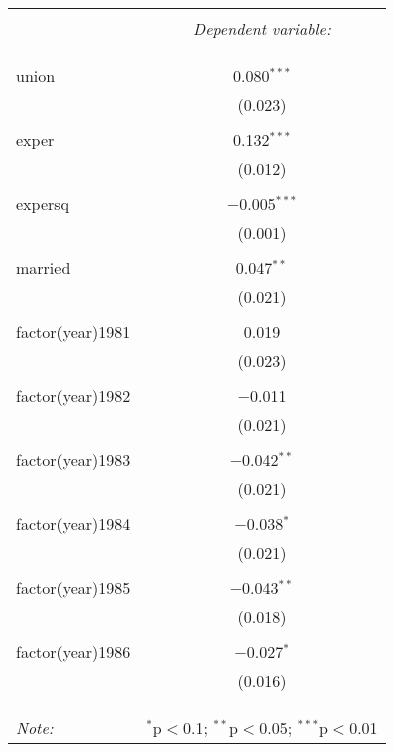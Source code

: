 
\begin{table}[!htbp] \centering 
  \caption{} 
  \label{} 
\begin{tabular}{@{\extracolsep{5pt}}lc} 
\\[-1.8ex]\hline 
\hline \\[-1.8ex] 
 & \multicolumn{1}{c}{\textit{Dependent variable:}} \\ 
\cline{2-2} 
\\[-1.8ex] &   \\ 
\hline \\[-1.8ex] 
 union & 0.080$^{***}$ \\ 
  & (0.023) \\ 
  & \\ 
 exper & 0.132$^{***}$ \\ 
  & (0.012) \\ 
  & \\ 
 expersq & $-$0.005$^{***}$ \\ 
  & (0.001) \\ 
  & \\ 
 married & 0.047$^{**}$ \\ 
  & (0.021) \\ 
  & \\ 
 factor(year)1981 & 0.019 \\ 
  & (0.023) \\ 
  & \\ 
 factor(year)1982 & $-$0.011 \\ 
  & (0.021) \\ 
  & \\ 
 factor(year)1983 & $-$0.042$^{**}$ \\ 
  & (0.021) \\ 
  & \\ 
 factor(year)1984 & $-$0.038$^{*}$ \\ 
  & (0.021) \\ 
  & \\ 
 factor(year)1985 & $-$0.043$^{**}$ \\ 
  & (0.018) \\ 
  & \\ 
 factor(year)1986 & $-$0.027$^{*}$ \\ 
  & (0.016) \\ 
  & \\ 
\hline \\[-1.8ex] 
\hline 
\hline \\[-1.8ex] 
\textit{Note:}  & \multicolumn{1}{r}{$^{*}$p$<$0.1; $^{**}$p$<$0.05; $^{***}$p$<$0.01} \\ 
\end{tabular} 
\end{table} 
